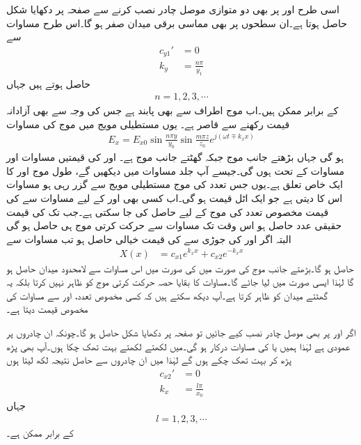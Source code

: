 اسی طرح  اور  پر بھی دو متوازی موصل چادر نصب کرنے سے صفحہ  پر دکھایا شکل  حاصل ہوتا ہے۔ان سطحوں پر بھی مماسی برقی میدان صفر ہو گا۔اس طرح مساوات  سے
\begin{align}
c_{y1}'&=0\\
k_y &=\frac{n \pi}{y_1}\label{مساوات_مویج_میکس_ویل_عمومی_مستطیلی_شرط_ب}
\end{align}
حاصل ہوتے ہیں جہاں
\begin{align}
n=1,2,3,\cdots
\end{align}
کے برابر ممکن ہیں۔اب موج  اطراف سے بھی  پابند ہے جس کی وجہ سے  بھی آزادانہ قیمت رکھنے سے قاصر ہے۔ یوں مستطیلی مویج میں موج کی مساوات 
\begin{align}
E_x=E_{x0} \sin \frac{n\pi y}{y_0} \sin \frac{m\pi z}{z_0} e^{j(\omega t \mp k_x x)}
\end{align}
ہو گی جہاں  بڑھتے  جانب موج جبکہ  گھٹتے  جانب موج ہے۔  اور  کی قیمتیں مساوات  اور مساوات  کے تحت ہوں گی۔جیسے آپ جلد مساوات  میں دیکھیں گے، طول موج اور  کا ایک خاص تعلق ہے۔یوں جس تعدد کی موج مستطیلی مویج سے گزر رہی ہو مساوات  اس کا  دیتی ہے جو ایک  اٹل قیمت ہو گی۔اب کسی بھی  اور  کے لیے مساوات  سے  کی قیمت مخصوص تعدد کی موج کے لیے حاصل کی جا سکتی ہے۔جب تک  کی قیمت حقیقی عدد حاصل ہو اس وقت تک مساوات  سے  حرکت کرتی موج ہی حاصل ہو گی البتہ اگر   اور  کی جوڑی سے  کی قیمت خیالی حاصل ہو تب مساوات    سے
\begin{align*}
X(x)&=c_{x1}e^{k_x x}+c_{x2}e^{ - k_x x} 
\end{align*}
حاصل ہو گا۔بڑھتے  جانب موج  کی صورت میں  کی صورت میں اس مساوات سے لامحدود میدان حاصل ہو گا لہٰذا ایسی صورت میں  لیا جائے گا۔مساوات کا بقایا حصہ حرکت کرتی موج کو ظاہر نہیں کرتا بلکہ یہ گھٹتے میدان کو ظاہر کرتا ہے۔آپ دیکھ سکتے ہیں کہ کسی مخصوص تعدد،  اور 
 سے مساوات   کی مخصوص قیمت دیتا ہے۔ 

اگر  اور  پر بھی موصل چادر نصب کیے جائیں تو صفحہ  پر دکھایا شکل  حاصل ہو گا۔چونکہ  ان چادروں پر  عمودی ہے لہٰذا ہمیں  یا  کی مساوات درکار ہو گی۔میں لکھتے لکھتے بہت تھک  چکا ہوں۔آپ بھی پڑھ پڑھ کر بہت تھک چکے ہوں گے لہٰذا میں ان چادروں سے حاصل نتیجہ لکھ لیتا ہوں
\begin{align}
c_{x2}'&=0\\
k_x&=\frac{l\pi}{x_0}
\end{align} 
جہاں
\begin{align}
l=1,2,3,\cdots
\end{align}
کے برابر ممکن ہے۔

